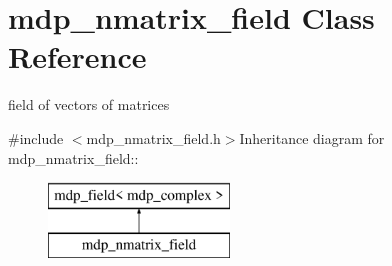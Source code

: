 \hypertarget{classmdp__nmatrix__field}{
\section{mdp\_\-nmatrix\_\-field Class Reference}
\label{classmdp__nmatrix__field}
}


field of vectors of matrices  


{\ttfamily \#include $<$mdp\_\-nmatrix\_\-field.h$>$}Inheritance diagram for mdp\_\-nmatrix\_\-field::\begin{figure}[H]
\begin{center}
\leavevmode
\includegraphics[height=2cm]{classmdp__nmatrix__field}
\end{center}
\end{figure}
